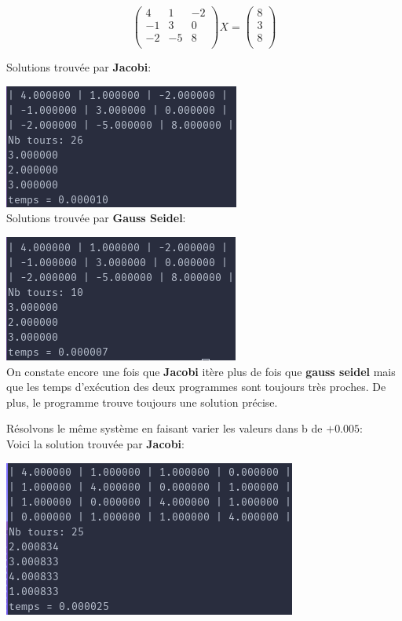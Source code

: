 \documentclass[a4paper]{article}
\begin{document}
\[
\begin{pmatrix}
  4 & 1 & -2\\
  -1 & 3 & 0\\
  -2 & -5 & 8\\
\end{pmatrix}X =
\begin{pmatrix}
  8\\
  3\\
  8\\
\end{pmatrix}
\]


Solutions trouvée par \textbf{Jacobi}:

\includegraphics[scale=0.5]{./img/jacobi/jac_ex_4.png}\\

Solutions trouvée par \textbf{Gauss Seidel}:

\includegraphics[scale=0.5]{./img/gauss_seidel/g_e_ex_4.png}\\

On constate encore une fois que \textbf{Jacobi} itère plus de fois que
\textbf{gauss seidel} mais que les temps d’exécution des deux programmes sont
toujours très proches. De plus, le programme trouve toujours une solution
précise.

Résolvons le même système en faisant varier les valeurs dans b de $+0.005$:\\

Voici la solution trouvée par \textbf{Jacobi}:

\includegraphics[scale=0.5]{./img/jacobi/jac_ex_1_mod.png}
\end{document}
